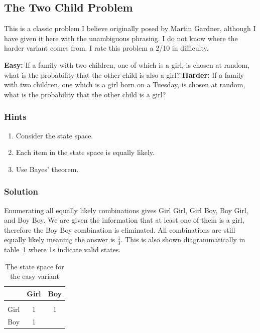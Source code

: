 \subsection{The Two Child Problem}

This is a classic problem I believe originally posed by Martin Gardner, although I have given it here with the unambiguous phrasing. I do not know where the harder variant comes from. I rate this problem a 2/10 in difficulty.

\textbf{Easy:} If a family with two children, one of which is a girl, is chosen at random, what is the probability that the other child is also a girl? \textbf{Harder:} If a family with two children, one which is a girl born on a Tuesday, is chosen at random, what is the probability that the other child is a girl?

\subsubsection{Hints}

\begin{enumerate}
	\item Consider the state space.
	\item Each item in the state space is equally likely.
	\item Use Bayes' theorem.
\end{enumerate}

\subsubsection{Solution}

Enumerating all equally likely combinations gives Girl Girl, Girl Boy, Boy Girl, and Boy Boy. We are given the information that at least one of them is a girl, therefore the Boy Boy combination is eliminated. All combinations are still equally likely meaning the answer is $\frac{1}{3}$. This is also shown diagrammatically in table~\ref{tab:TheTwoChildProblem_StateSpaceEasy} where 1s indicate valid states.

\begin{table}[H]
	\centering
	\caption{The state space for the easy variant}
	\label{tab:TheTwoChildProblem_StateSpaceEasy}
	\begin{tabular}{c|cc}
		& Girl & Boy  \\
		\hline
		&&  \\[-10pt]
		Girl & 1 & 1  \\
		Boy  & 1 & \\
	\end{tabular}
\end{table}

